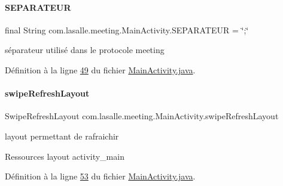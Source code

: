 \paragraph{\texorpdfstring{S\+E\+P\+A\+R\+A\+T\+E\+UR}{SEPARATEUR}}
{\footnotesize\ttfamily final String com.\+lasalle.\+meeting.\+Main\+Activity.\+S\+E\+P\+A\+R\+A\+T\+E\+UR = \char`\"{};\char`\"{}\hspace{0.3cm}{\ttfamily [private]}}



séparateur utilisé dans le protocole meeting 



Définition à la ligne \hyperlink{_main_activity_8java_source_l00049}{49} du fichier \hyperlink{_main_activity_8java_source}{Main\+Activity.\+java}.

\mbox{\label{classcom_1_1lasalle_1_1meeting_1_1_main_activity_a8feba36a47aa90a06a1df709d24799ec}} 
\paragraph{\texorpdfstring{swipe\+Refresh\+Layout}{swipeRefreshLayout}}
{\footnotesize\ttfamily Swipe\+Refresh\+Layout com.\+lasalle.\+meeting.\+Main\+Activity.\+swipe\+Refresh\+Layout\hspace{0.3cm}{\ttfamily [private]}}



layout permettant de rafraichir 

Ressources layout activity\+\_\+main 

Définition à la ligne \hyperlink{_main_activity_8java_source_l00053}{53} du fichier \hyperlink{_main_activity_8java_source}{Main\+Activity.\+java}.

\mbox{\label{classcom_1_1lasalle_1_1meeting_1_1_main_activity_a8f934680ad3a7ec4ad0fea748f0b7506}} 
